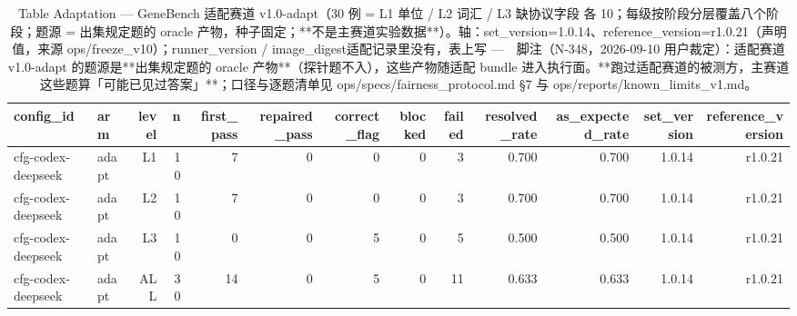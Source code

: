\begin{table}[t]
\centering
\caption{Table Adaptation — GeneBench 适配赛道 v1.0-adapt（30 例 = L1 单位 / L2 词汇 / L3 缺协议字段 各 10；每级按阶段分层覆盖八个阶段；题源 = 出集规定题的 oracle 产物，种子固定；**不是主赛道实验数据**）。轴：set\_version=1.0.14、reference\_version=r1.0.21（声明值，来源 ops/freeze\_v10）；runner\_version / image\_digest适配记录里没有，表上写 ---　脚注（N-348，2026-09-10 用户裁定）：适配赛道 v1.0-adapt 的题源是**出集规定题的 oracle 产物**（探针题不入），这些产物随适配 bundle 进入执行面。**跑过适配赛道的被测方，主赛道这些题算「可能已见过答案」**；口径与逐题清单见 ops/specs/fairness\_protocol.md §7 与 ops/reports/known\_limits\_v1.md。}
\label{tab:adaptation}
\begin{tabular}{llrrrrrrrrrrr}
\toprule
config\_id & arm & level & n & first\_pass & repaired\_pass & correct\_flag & blocked & failed & resolved\_rate & as\_expected\_rate & set\_version & reference\_version \\
\midrule
cfg-codex-deepseek & adapt & L1 & 10 & 7 & 0 & 0 & 0 & 3 & 0.700 & 0.700 & 1.0.14 & r1.0.21 \\
cfg-codex-deepseek & adapt & L2 & 10 & 7 & 0 & 0 & 0 & 3 & 0.700 & 0.700 & 1.0.14 & r1.0.21 \\
cfg-codex-deepseek & adapt & L3 & 10 & 0 & 0 & 5 & 0 & 5 & 0.500 & 0.500 & 1.0.14 & r1.0.21 \\
cfg-codex-deepseek & adapt & ALL & 30 & 14 & 0 & 5 & 0 & 11 & 0.633 & 0.633 & 1.0.14 & r1.0.21 \\
\bottomrule
\end{tabular}
\end{table}
